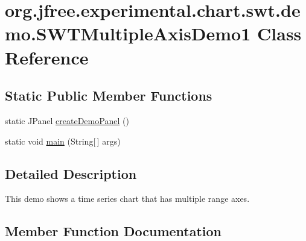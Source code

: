 \hypertarget{classorg_1_1jfree_1_1experimental_1_1chart_1_1swt_1_1demo_1_1_s_w_t_multiple_axis_demo1}{}\section{org.\+jfree.\+experimental.\+chart.\+swt.\+demo.\+S\+W\+T\+Multiple\+Axis\+Demo1 Class Reference}
\label{classorg_1_1jfree_1_1experimental_1_1chart_1_1swt_1_1demo_1_1_s_w_t_multiple_axis_demo1}
\subsection*{Static Public Member Functions}
\begin{DoxyCompactItemize}
\item 
static J\+Panel \mbox{\hyperlink{classorg_1_1jfree_1_1experimental_1_1chart_1_1swt_1_1demo_1_1_s_w_t_multiple_axis_demo1_aeb764eca7ed5223d78af209e2673794d}{create\+Demo\+Panel}} ()
\item 
static void \mbox{\hyperlink{classorg_1_1jfree_1_1experimental_1_1chart_1_1swt_1_1demo_1_1_s_w_t_multiple_axis_demo1_a8139ba3d5cc57989552ea58f1e661482}{main}} (String\mbox{[}$\,$\mbox{]} args)
\end{DoxyCompactItemize}


\subsection{Detailed Description}
This demo shows a time series chart that has multiple range axes. 

\subsection{Member Function Documentation}
\mbox{\label{classorg_1_1jfree_1_1experimental_1_1chart_1_1swt_1_1demo_1_1_s_w_t_multiple_axis_demo1_aeb764eca7ed5223d78af209e2673794d}} 
